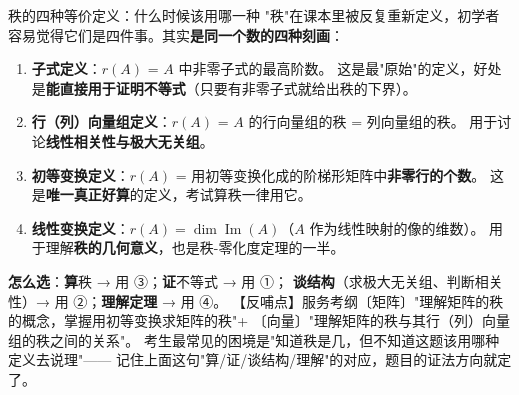 
\begin{fdeep}{秩的四种等价定义：什么时候该用哪一种}
"秩"在课本里被反复重新定义，初学者容易觉得它们是四件事。其实\textbf{是同一个数的四种刻画}：
\begin{enumerate}[leftmargin=2.2em,itemsep=0.25em]
\item \textbf{子式定义}：$r(A)$ = $A$ 中非零子式的最高阶数。
      这是最"原始"的定义，好处是\textbf{能直接用于证明不等式}（只要有非零子式就给出秩的下界）。
\item \textbf{行（列）向量组定义}：$r(A)$ = $A$ 的行向量组的秩 = 列向量组的秩。
      用于讨论\textbf{线性相关性与极大无关组}。
\item \textbf{初等变换定义}：$r(A)$ = 用初等变换化成的阶梯形矩阵中\textbf{非零行的个数}。
      这是\textbf{唯一真正好算}的定义，考试算秩一律用它。
\item \textbf{线性变换定义}：$r(A)=\dim\operatorname{Im}(A)$（$A$ 作为线性映射的像的维数）。
      用于理解\textbf{秩的几何意义}，也是秩-零化度定理的一半。
\end{enumerate}
\textbf{怎么选}：\textbf{算}秩 → 用 ③；\textbf{证}不等式 → 用 ①；
\textbf{谈结构}（求极大无关组、判断相关性）→ 用 ②；\textbf{理解定理} → 用 ④。
【反哺点】服务考纲〔矩阵〕"理解矩阵的秩的概念，掌握用初等变换求矩阵的秩"+
〔向量〕"理解矩阵的秩与其行（列）向量组的秩之间的关系"。
考生最常见的困境是"知道秩是几，但不知道这题该用哪种定义去说理"——
记住上面这句"算/证/谈结构/理解"的对应，题目的证法方向就定了。
\end{fdeep}

